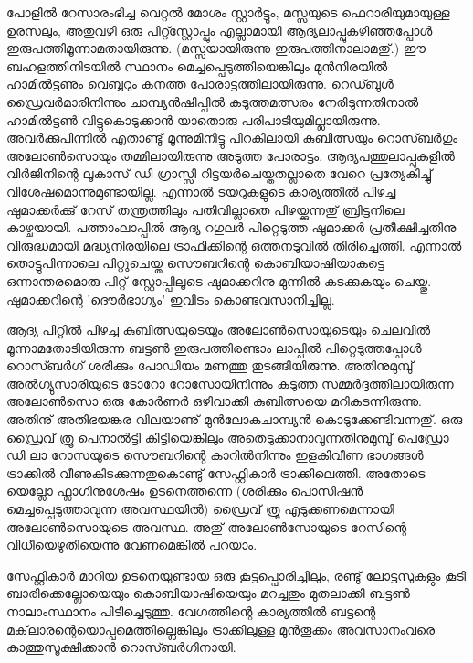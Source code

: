 പോളില്‍ റേസാരംഭിച്ച വെറ്റല്‍ മോശം സ്റ്റാര്‍ട്ടും, മസ്സയുടെ ഫെറാരിയുമായുള്ള ഉരസലും, അതുവഴി ഒരു പിറ്റ്സ്റ്റോപ്പും എല്ലാമായി 
ആദ്യലാപ്പുകഴിഞ്ഞപ്പോള്‍ ഇരുപത്തിമൂന്നാമതായിരുന്നു. (മസ്സയായിരുന്നു ഇരുപത്തിനാലാമതു്.) ഈ ബഹളത്തിനിടയില്‍ സ്ഥാനം 
മെച്ചപ്പെടുത്തിയെങ്കിലും മുന്‍നിരയില്‍ ഹാമില്‍ട്ടണും വെബ്ബറും കനത്ത പോരാട്ടത്തിലായിരുന്നു. റെഡ്ബുള്‍ ഡ്രൈവര്‍മാരിനിന്നും
 ചാമ്പ്യന്‍ഷിപ്പില്‍ കടുത്തമത്സരം നേരിടുന്നതിനാല്‍ ഹാമില്‍ട്ടണ്‍ വിട്ടുകൊടുക്കാന്‍ യാതൊരു പരിപാടിയുമില്ലായിരുന്നു. അവര്‍ക്കുപിന്നില്‍ 
 എതാണ്ടു് മൂന്നുമിനിട്ടു പിറകിലായി കുബിത്സയും റൊസ്ബര്‍ഗും അലോണ്‍സൊയും തമ്മിലായിരുന്നു അടുത്ത പോരാട്ടം. 
 ആദ്യപത്തുലാപ്പുകളില്‍ വിര്‍ജിനിന്റെ ലൂകാസ് ഡി ഗ്രാസ്സി റിട്ടയര്‍ചെയ്തതല്ലാതെ വേറെ പ്രത്യേകിച്ചു് വിശേഷമൊന്നുമുണ്ടായില്ല. 
 എന്നാല്‍ ടയറുകളുടെ കാര്യത്തില്‍ പിഴച്ച ഷുമാക്കര്‍ക്കു് റേസ് തന്ത്രത്തിലും പതിവില്ലാതെ പിഴയ്ക്കുന്നതു് ബ്രിട്ടനിലെ കാഴ്ചയായി. 
 പത്താംലാപ്പില്‍ ആദ്യ റഗുലര്‍ പിറ്റെടുത്ത ഷുമാക്കര്‍ പ്രതീക്ഷിച്ചതിനു വിരുദ്ധമായി മദ്ധ്യനിരയിലെ ട്രാഫിക്കിന്റെ ഒത്തനടുവില്‍ 
 തിരിച്ചെത്തി. എന്നാല്‍ തൊട്ടുപിന്നാലെ പിറ്റുചെയ്ത സൌബറിന്റെ കൊബിയാഷിയാകട്ടെ ഒന്നാന്തരമൊരു പിറ്റ് സ്റ്റോപ്പിലൂടെ 
 ഷുമാക്കറിനു മുന്നില്‍ കടക്കുകയും ചെയ്തു. ഷുമാക്കറിന്റെ 'ദൌര്‍ഭാഗ്യം' ഇവിടം കൊണ്ടവസാനിച്ചില്ല.

ആദ്യ പിറ്റില്‍ പിഴച്ച കുബിത്സയുടെയും അലോണ്‍സൊയുടെയും ചെലവില്‍ മൂന്നാമതോടിയിരുന്ന ബട്ടണ്‍ ഇരുപത്തിരണ്ടാം ലാപ്പില്‍ 
പിറ്റെടുത്തപ്പോള്‍ റൊസ്ബര്‍ഗ് ശരിക്കും പോഡിയം മണത്തു തുടങ്ങിയിരുന്നു. അതിനുമുമ്പു് അല്‍ഗ്യുസാരിയുടെ ടോറോ റോസോയിനിന്നും കടുത്ത സമ്മര്‍ദ്ദത്തിലായിരുന്ന അലോണ്‍സൊ ഒരു കോര്‍ണര്‍ ഒഴിവാക്കി കുബിത്സയെ മറികടന്നിരുന്നു. അതിനു് അതിഭയങ്കര 
വിലയാണു് മുന്‍ലോകചാമ്പ്യന്‍ കൊടുക്കേണ്ടിവന്നതു്. ഒരു ഡ്രൈവ് ത്രൂ പെനാല്‍ട്ടി കിട്ടിയെങ്കിലും അതെടുക്കാനാവുന്നതിനുമുമ്പു് 
പെഡ്രോ ഡി ലാ റോസയുടെ സൌബറിന്റെ കാറില്‍നിന്നും ഇളകിവീണ ഭാഗങ്ങള്‍ ട്രാക്കില്‍ വീണുകിടക്കുന്നതുകൊണ്ടു് സേഫ്റ്റികാര്‍ 
ട്രാക്കിലെത്തി. അതോടെ യെല്ലോ ഫ്ലാഗിനുശേഷം ഉടനെത്തന്നെ (ശരിക്കും പൊസിഷന്‍ മെച്ചപ്പെടുത്താവുന്ന അവസ്ഥയില്‍) 
ഡ്രൈവ് ത്രൂ എടുക്കണമെന്നായി അലോണ്‍സൊയുടെ അവസ്ഥ. അതു് അലോണ്‍സോയുടെ റേസിന്റെ വിധീയെഴുതിയെന്നു വേണമെങ്കില്‍ പറയാം.

സേഫ്റ്റികാര്‍ മാറിയ ഉടനെയുണ്ടായ ഒരു കൂട്ടപ്പൊരിച്ചിലും, രണ്ടു് ലോട്ടസുകളും കൂടി ബാരിക്കെല്ലോയെയും കൊബിയാഷിയെയും മറച്ചതും
 മുതലാക്കി ബട്ടണ്‍ നാലാംസ്ഥാനം പിടിച്ചെടുത്തു. വേഗത്തിന്റെ കാര്യത്തില്‍ ബട്ടന്റെ മക്‌ലാരന്റെയൊപ്പമെത്തില്ലെങ്കിലും ട്രാക്കിലുള്ള 
 മുന്‍തൂക്കം അവസാനംവരെ കാത്തുസൂക്ഷിക്കാന്‍ റൊസ്ബര്‍ഗിനായി.

